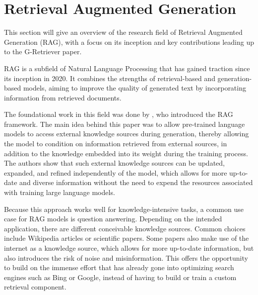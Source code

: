 \section{Retrieval Augmented Generation}

This section will give an overview of the research field of Retrieval Augmented Generation (RAG), with a focus on its inception and key contributions leading up to the G-Retriever paper.

RAG is a subfield of Natural Language Processing that has gained traction since its inception in 2020. It combines the strengths of retrieval-based and generation-based models, aiming to improve the quality of generated text by incorporating information from retrieved documents.

The foundational work in this field was done by \cite{rag}, who introduced the RAG framework.
The main idea behind this paper was to allow pre-trained language models to access external knowledge sources during generation, thereby allowing the model to condition on information retrieved from external sources, in addition to  the knowledge embedded into its weight during the training process.
The authors show that such external knowledge sources can be updated, expanded, and refined independently of the model, which allows for more up-to-date and diverse information without the need to expend the resources associated with training large language models.

Because this approach works well for knowledge-intensive tasks, a common use case for RAG models is question answering.
Depending on the intended application, there are different conceivable knowledge sources.
Common choices include Wikipedia articles or scientific papers.
Some papers also make use of the internet as a knowledge source, which allows for more up-to-date information, but also introduces the risk of noise and misinformation.
This offers the opportunity to build on the immense effort that has already gone into optimizing search engines such as Bing or Google, instead of having to build or train a custom retrieval component.
